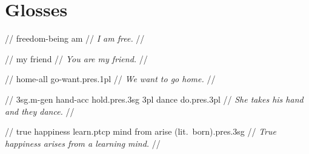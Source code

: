 \documentclass{article}
\begin{document}
\newpage\section{Glosses}

\ex
\begingl
\gla {}   //
 freedom-being am //
\glft \textit{I am free.} //
\endgl
\xe

\ex
\begingl
\gla {}   //
 my friend //
\glft \textit{You are my friend.} //
\endgl
\xe

\ex
\begingl
\gla {}   //
 home-{\sc all} go-want.{\sc pres.1pl} //
\glft \textit{We want to go home.} //
\endgl
\xe

\ex
\begingl
\gla {}       //
 {\sc 3sg.m}-{\sc gen} hand-{\sc acc} hold.{\sc pres.3sg} {\sc 3pl} dance do.{\sc pres.3pl} //
\glft \textit{She takes his hand and they dance.} //
\endgl
\xe

\ex
\begingl
\gla {}      //
\glb true happiness learn.{\sc ptcp} mind from {arise (lit.\ born).{\sc pres.3sg}} //
\glft \textit{True happiness arises from a learning mind.} //
\endgl
\xe
\end{document}
